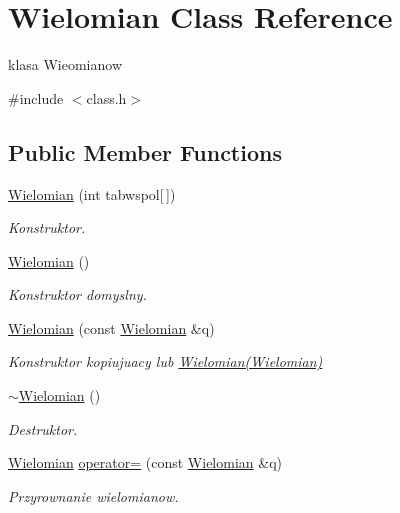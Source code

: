 \hypertarget{class_wielomian}{\section{Wielomian Class Reference}
\label{class_wielomian}
}


klasa Wieomianow  




{\ttfamily \#include $<$class.\-h$>$}

\subsection*{Public Member Functions}
\begin{DoxyCompactItemize}
\item 
\hyperlink{class_wielomian_a3be025810e102a0b5f6e5c8a59529e47}{Wielomian} (int tabwspol\mbox{[}$\,$\mbox{]})
\begin{DoxyCompactList}\small\item\em Konstruktor. \end{DoxyCompactList}\item 
\hyperlink{class_wielomian_a8c0062e21077bfca113a5c8ef1c3d326}{Wielomian} ()
\begin{DoxyCompactList}\small\item\em Konstruktor domyslny. \end{DoxyCompactList}\item 
\hyperlink{class_wielomian_aa69a2d7c3ed6a59e1758896e7e2db627}{Wielomian} (const \hyperlink{class_wielomian}{Wielomian} \&q)
\begin{DoxyCompactList}\small\item\em Konstruktor kopiujuacy lub \hyperlink{class_wielomian}{Wielomian(\-Wielomian)} \end{DoxyCompactList}\item 
\hyperlink{class_wielomian_a1e55341cd51706553cf0612c2cc73085}{$\sim$\-Wielomian} ()
\begin{DoxyCompactList}\small\item\em Destruktor. \end{DoxyCompactList}\item 
\hyperlink{class_wielomian}{Wielomian} \hyperlink{class_wielomian_a0a1344fe7237d77502948a250ae0eb7b}{operator=} (const \hyperlink{class_wielomian}{Wielomian} \&q)
\begin{DoxyCompactList}\small\item\em Przyrownanie wielomianow. \end{DoxyCompactList}\item 

\end{DoxyCompactItemize}
